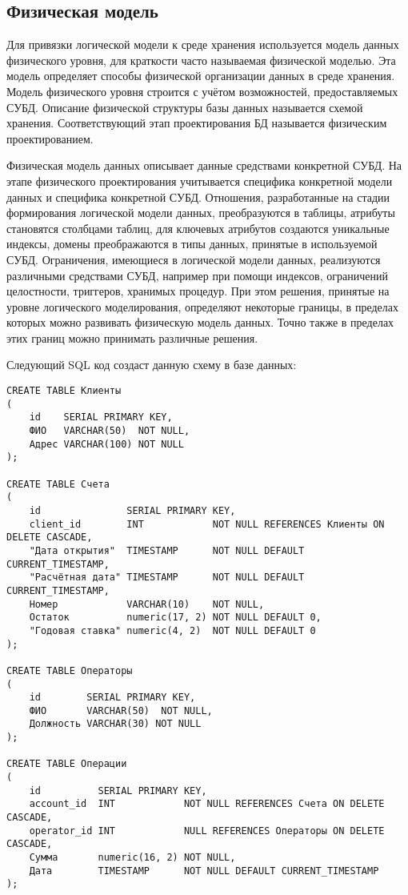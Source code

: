 \documentclass[14pt]{extarticle}
\begin{document}
    \newpage
    \subsection{Физическая модель}

    Для привязки логической модели к среде хранения используется модель данных физического уровня, для краткости часто называемая физической моделью. Эта модель определяет способы физической организации данных в среде хранения. Модель физического уровня строится с учётом возможностей, предоставляемых СУБД. Описание физической структуры базы данных называется схемой хранения. Соответствующий этап проектирования БД называется физическим проектированием.

    Физическая модель данных описывает данные средствами конкретной СУБД. На этапе физического проектирования учитывается специфика конкретной модели данных и специфика конкретной СУБД. Отношения, разработанные на стадии формирования логической модели данных, преобразуются в таблицы, атрибуты становятся столбцами таблиц, для ключевых атрибутов создаются уникальные индексы, домены преображаются в типы данных, принятые в используемой СУБД. Ограничения, имеющиеся в логической модели данных, реализуются различными средствами СУБД, например при помощи индексов, ограничений целостности, триггеров, хранимых процедур. При этом решения, принятые на уровне логического моделирования, определяют некоторые границы, в пределах которых можно развивать физическую модель данных. Точно также в пределах этих границ можно принимать различные решения.

    \newpage

    Следующий SQL код создаст данную схему в базе данных:

    \begin{verbatim}
CREATE TABLE Клиенты
(
    id    SERIAL PRIMARY KEY,
    ФИО   VARCHAR(50)  NOT NULL,
    Адрес VARCHAR(100) NOT NULL
);

CREATE TABLE Счета
(
    id               SERIAL PRIMARY KEY,
    client_id        INT            NOT NULL REFERENCES Клиенты ON DELETE CASCADE,
    "Дата открытия"  TIMESTAMP      NOT NULL DEFAULT CURRENT_TIMESTAMP,
    "Расчётная дата" TIMESTAMP      NOT NULL DEFAULT CURRENT_TIMESTAMP,
    Номер            VARCHAR(10)    NOT NULL,
    Остаток          numeric(17, 2) NOT NULL DEFAULT 0,
    "Годовая ставка" numeric(4, 2)  NOT NULL DEFAULT 0
);

CREATE TABLE Операторы
(
    id        SERIAL PRIMARY KEY,
    ФИО       VARCHAR(50)  NOT NULL,
    Должность VARCHAR(30) NOT NULL
);

CREATE TABLE Операции
(
    id          SERIAL PRIMARY KEY,
    account_id  INT            NOT NULL REFERENCES Счета ON DELETE CASCADE,
    operator_id INT            NULL REFERENCES Операторы ON DELETE CASCADE,
    Сумма       numeric(16, 2) NOT NULL,
    Дата        TIMESTAMP      NOT NULL DEFAULT CURRENT_TIMESTAMP
);
    \end{verbatim}
\end{document}
